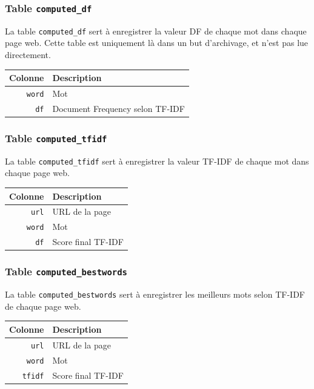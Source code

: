 		\subsubsection{Table \texttt{computed\_df}}\label{table-computed-df}
			La table \texttt{computed\_df} sert à enregistrer la valeur DF de chaque mot dans chaque page web. Cette table est uniquement là dans un but d'archivage, et n'est pas lue directement.

			\begin{tabular}{rl}
				\textbf{Colonne} & \textbf{Description} \\
				\hline
			    \texttt{word} & Mot \\
			    \texttt{df} & Document Frequency selon TF-IDF \\
			\end{tabular}
		
 		\subsubsection{Table \texttt{computed\_tfidf}}\label{table-computed-tfidf}
			La table \texttt{computed\_tfidf} sert à enregistrer la valeur TF-IDF de chaque mot dans chaque page web.

			\begin{tabular}{rl}
				\textbf{Colonne} & \textbf{Description} \\
				\hline
				\texttt{url} & URL de la page \\
			    \texttt{word} & Mot \\
			    \texttt{df} & Score final TF-IDF \\
			\end{tabular}
		
		\subsubsection{Table \texttt{computed\_bestwords}}\label{table-computed-bestwords}
			La table \texttt{computed\_bestwords} sert à enregistrer les meilleurs mots selon TF-IDF de chaque page web.

			\begin{tabular}{rl}
				\textbf{Colonne} & \textbf{Description} \\
				\hline
				\texttt{url} & URL de la page \\
			    \texttt{word} & Mot \\
			    \texttt{tfidf} & Score final TF-IDF \\
			\end{tabular}
		
